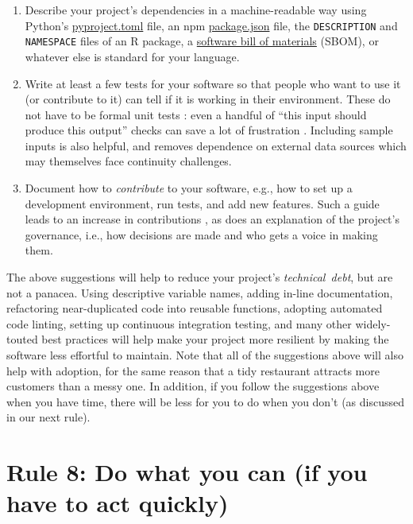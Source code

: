 \documentclass[10pt,letterpaper]{article}
\begin{document}
\begin{enumerate}
\item
  Describe your project's dependencies in a machine-readable way
  using Python's \href{https://packaging.python.org/en/latest/guides/writing-pyproject-toml/}{pyproject.toml} file,
  an npm \href{https://docs.npmjs.com/cli/v10/configuring-npm/package-json?v=true}{package.json} file,
  the \texttt{DESCRIPTION} and \texttt{NAMESPACE} files of an R package,
  a \href{https://openssf.org/technical-initiatives/sbom-tools/}{software bill of materials} (SBOM),
  or whatever else is standard for your language.

\item
  Write at least a few tests for your software
  so that people who want to use it (or contribute to it)
  can tell if it is working in their environment.
  These do not have to be formal unit tests \cite{Irving2021}:
  even a handful of ``this input should produce this output'' checks
  can save a lot of frustration \cite{Taschuk2017}.
  Including sample inputs is also helpful,
  and removes dependence on external data sources which may themselves face continuity challenges.

\item
  Document how to \emph{contribute} to your software,
  e.g.,
  how to set up a development environment,
  run tests,
  and add new features.
  Such a guide leads to an increase in contributions \cite{Sholler2019},
  as does an explanation of the project's governance,
  i.e.,
  how decisions are made and who gets a voice in making them.

\end{enumerate}

The above suggestions will help to reduce your project's \emph{technical~debt}, but are not a panacea.
Using descriptive variable names, adding in-line documentation,
refactoring near-duplicated code into reusable functions, adopting automated code linting,
setting up continuous integration testing,
and many other widely-touted best practices will help make your project more resilient
by making the software less effortful to maintain.
Note that all of the suggestions above will also help with adoption,
for the same reason that a tidy restaurant attracts more customers than a messy one.
In addition,
if you follow the suggestions above when you have time,
there will be less for you to do when you don't
(as discussed in our next rule).

\section*{Rule 8: Do what you can (if you have to act quickly)}
\end{document}
